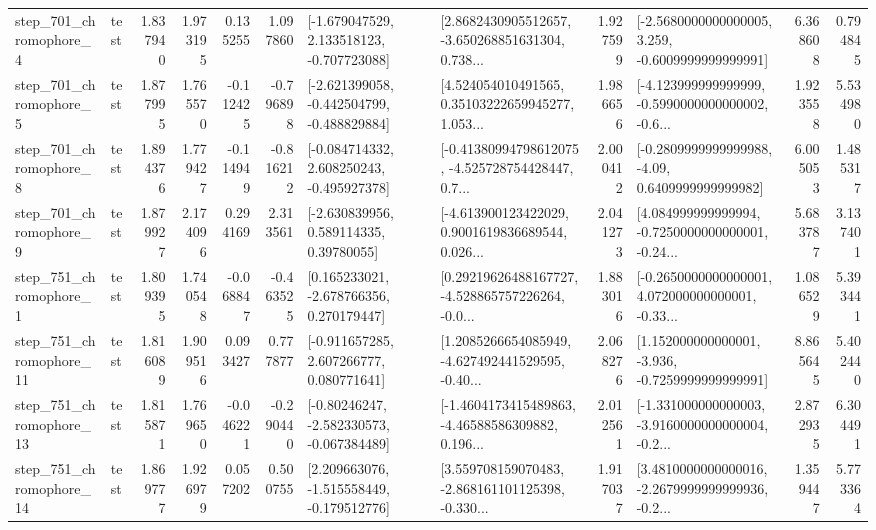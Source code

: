 \begin{tabular}{llrrrrllrlrr}
   step\_701\_chromophore\_4 &      test &      1.837940 &    1.973195 &      0.135255 &  1.097860 &   [-1.679047529, 2.133518123, -0.707723088] &  [2.8682430905512657, -3.650268851631304, 0.738... &       1.927599 &  [-2.5680000000000005, 3.259, -0.6009999999999991] &            6.368608 &          0.794845 \\
   step\_701\_chromophore\_5 &      test &      1.877995 &    1.765570 &     -0.112425 & -0.796898 &  [-2.621399058, -0.442504799, -0.488829884] &  [4.524054010491565, 0.35103222659945277, 1.053... &       1.986656 &  [-4.123999999999999, -0.5990000000000002, -0.6... &            1.923558 &          5.534980 \\
   step\_701\_chromophore\_8 &      test &      1.894376 &    1.779427 &     -0.114949 & -0.816212 &   [-0.084714332, 2.608250243, -0.495927378] &  [-0.41380994798612075, -4.525728754428447, 0.7... &       2.000412 &   [-0.2809999999999988, -4.09, 0.6409999999999982] &            6.005053 &          1.485317 \\
   step\_701\_chromophore\_9 &      test &      1.879927 &    2.174096 &      0.294169 &  2.313561 &     [-2.630839956, 0.589114335, 0.39780055] &  [-4.613900123422029, 0.9001619836689544, 0.026... &       2.041273 &  [4.084999999999994, -0.7250000000000001, -0.24... &            5.683787 &          3.137401 \\
   step\_751\_chromophore\_1 &      test &      1.809395 &    1.740548 &     -0.068847 & -0.463525 &    [0.165233021, -2.678766356, 0.270179447] &  [0.29219626488167727, -4.528865757226264, -0.0... &       1.883016 &  [-0.2650000000000001, 4.072000000000001, -0.33... &            1.086529 &          5.393441 \\
  step\_751\_chromophore\_11 &      test &      1.816089 &    1.909516 &      0.093427 &  0.777877 &    [-0.911657285, 2.607266777, 0.080771641] &  [1.2085266654085949, -4.627492441529595, -0.40... &       2.068276 &   [1.152000000000001, -3.936, -0.7259999999999991] &            8.865645 &          5.402440 \\
  step\_751\_chromophore\_13 &      test &      1.815871 &    1.769650 &     -0.046221 & -0.290440 &   [-0.80246247, -2.582330573, -0.067384489] &  [-1.4604173415489863, -4.46588586309882, 0.196... &       2.012561 &  [-1.331000000000003, -3.9160000000000004, -0.2... &            2.872935 &          6.304491 \\
  step\_751\_chromophore\_14 &      test &      1.869777 &    1.926979 &      0.057202 &  0.500755 &   [2.209663076, -1.515558449, -0.179512776] &  [3.559708159070483, -2.868161101125398, -0.330... &       1.917037 &  [3.4810000000000016, -2.2679999999999936, -0.2... &            1.359447 &          5.773364 \\

\end{tabular}
